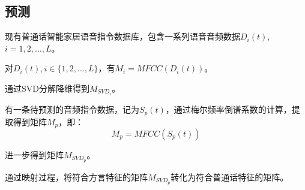\documentclass[lang=cn,cite=super]{elegantpaper}
\begin{document}
\subsection{预测}
现有普通话智能家居语音指令数据库，包含一系列语音音频数据$D_i(t)$, $i = 1, 2, \ldots, L$。

对$D_i(t), i\in \{1,2,\ldots, L\}$，有$M_i = MFCC(D_i(t))$。

通过SVD分解降维得到$M_{SVD_i}$。

有一条待预测的音频指令数据，记为$S_p(t)$，通过梅尔频率倒谱系数的计算，提取得到矩阵$M_p$，即：
\begin{equation}
    M_p = MFCC(S_p(t))
\end{equation}

进一步得到矩阵$M_{SVD_p}$。

通过映射过程，将符合方言特征的矩阵$M_{SVD_p}$转化为符合普通话特征的矩阵。
\end{document}
